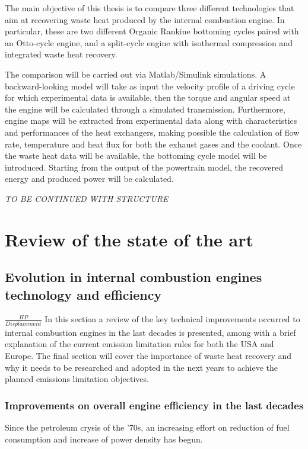 The main objective of this thesis is to compare three different technologies that aim at recovering waste heat produced by the internal combustion engine. In particular, these are two different Organic Rankine bottoming cycles paired with an Otto-cycle engine, and a split-cycle engine with isothermal compression and integrated waste heat recovery.

The comparison will be carried out via Matlab/Simulink simulations. A backward-looking model will take as input the velocity profile of a driving cycle for which experimental data is available, then the torque and angular speed at the engine will be calculated through a simulated transmission. Furthermore, engine maps will be extracted from experimental data along with characteristics and performances of the heat exchangers, making possible the calculation of flow rate, temperature and heat flux for both the exhaust gases and the coolant. Once the waste heat data will be available, the bottoming cycle model will be introduced. Starting from the output of the powertrain model, the recovered energy and produced power will be calculated.

\emph{TO BE CONTINUED WITH STRUCTURE}

\chapter{Review of the state of the art}

\section{Evolution in internal combustion engines technology and efficiency}
$\frac{HP}{Displacement}$
In this section a review of the key technical improvements occurred to internal combustion engines in the last decades is presented, among with a brief explanation of the current emission limitation rules for both the USA and Europe. The final section will cover the importance of waste heat recovery and why it needs to be researched and adopted in the next years to achieve the planned emissions limitation objectives.

\subsection{Improvements on overall engine efficiency in the last decades}

Since the petroleum crysis of the '70s, an increasing effort on reduction of fuel consumption and increase of power density has begun.

